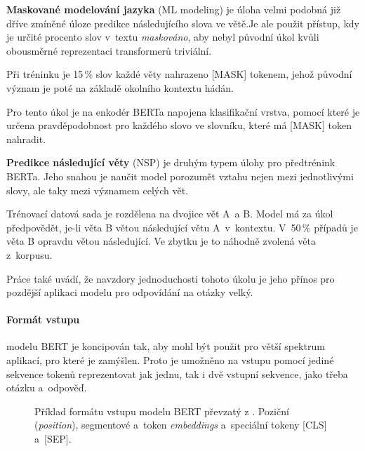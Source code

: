 \medskip
\textbf{Maskované modelování jazyka} (ML modeling) 
je úloha velmi podobná již dříve zmíněné úloze predikce následujícího slova ve větě.Je ale použit přístup, kdy je určité procento slov v~textu \emph{maskováno}, aby nebyl původní úkol kvůli obousměrné reprezentaci transformerů triviální.\par
Při tréninku je 15\,\% slov každé věty nahrazeno [MASK] tokenem, jehož původní význam je poté na základě okolního kontextu hádán.\par
Pro tento úkol je na enkodér BERTa napojena klasifikační vrstva, pomocí které je určena pravděpodobnost pro každého slovo ve slovníku, které má [MASK] token nahradit.\par
\smallskip
\textbf{Predikce následující věty} (NSP) je druhým typem úlohy pro předtrénink BERTa. Jeho snahou je naučit model porozumět vztahu nejen mezi jednotlivými slovy, ale taky mezi významem celých vět.\par
Trénovací datová sada je rozdělena na dvojice vět A~a B. Model má za úkol předpovědět, je-li věta B větou následující větu A~v~kontextu. V~50\,\% případů je věta B opravdu větou následující. Ve zbytku je to náhodně zvolená věta z~korpusu.\par
Práce \cite{BERT} také uvádí, že navzdory jednoduchosti tohoto úkolu je jeho přínos pro pozdější aplikaci modelu pro odpovídání na otázky velký.\par

\paragraph{Formát vstupu}
modelu BERT je koncipován tak, aby mohl být použit pro větší spektrum aplikací, pro které je zamýšlen. Proto je umožněno na vstupu pomocí jediné sekvence tokenů reprezentovat jak jednu, tak i dvě vstupní sekvence, jako třeba otázku a~odpověď.

\begin{figure}[hbt]
	\centering
	\caption{Příklad formátu vstupu  modelu BERT převzatý z \cite{BERT}. Poziční (\emph{position}), segmentové a~token \emph{embeddings} a~speciální tokeny [CLS] a~[SEP].}
	\label{bert_input}
\end{figure}

